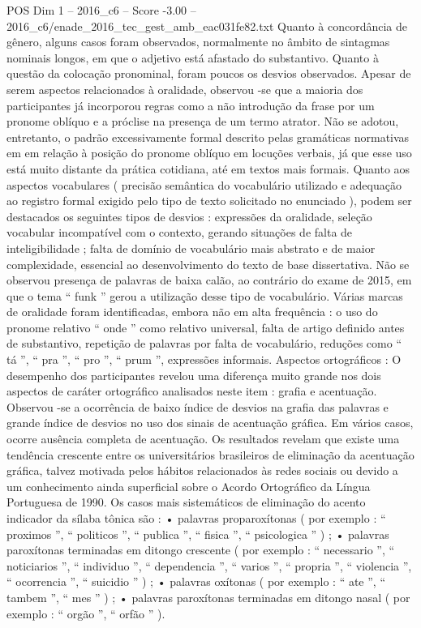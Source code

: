 \begin{textsample}{POS Dim 1 – 2016\_c6 – Score -3.00 – 2016\_c6/enade\_2016\_tec\_gest\_amb\_eac031fe82.txt}
Quanto à concordância de gênero, alguns casos foram observados, normalmente no âmbito de sintagmas nominais longos, em que o adjetivo está afastado do substantivo.
Quanto à questão da colocação pronominal, foram poucos os desvios observados.
Apesar de serem aspectos relacionados à oralidade, observou -se que a maioria dos participantes já incorporou regras como a não introdução da frase por um pronome oblíquo e a próclise na presença de um termo atrator.
Não se adotou, entretanto, o padrão excessivamente formal descrito pelas gramáticas normativas em em relação à posição do pronome oblíquo em locuções verbais, já que esse uso está muito distante da prática cotidiana, até em textos mais formais.
Quanto aos aspectos vocabulares ( precisão semântica do vocabulário utilizado e adequação ao registro formal exigido pelo tipo de texto solicitado no enunciado ), podem ser destacados os seguintes tipos de desvios : expressões da oralidade, seleção vocabular incompatível com o contexto, gerando situações de falta de inteligibilidade ; falta de domínio de vocabulário mais abstrato e de maior complexidade, essencial ao desenvolvimento do texto de base dissertativa.
Não se observou presença de palavras de baixa calão, ao contrário do exame de 2015, em que o tema “ funk ” gerou a utilização desse tipo de vocabulário.
Várias marcas de oralidade foram identificadas, embora não em alta frequência : o uso do pronome relativo “ onde ” como relativo universal, falta de artigo definido antes de substantivo, repetição de palavras por falta de vocabulário, reduções como “ tá ”, “ pra ”, “ pro ”, “ prum ”, expressões informais.
Aspectos ortográficos : O desempenho dos participantes revelou uma diferença muito grande nos dois aspectos de caráter ortográfico analisados neste item : grafia e acentuação.
Observou -se a ocorrência de baixo índice de desvios na grafia das palavras e grande índice de desvios no uso dos sinais de acentuação gráfica.
Em vários casos, ocorre ausência completa de acentuação.
Os resultados revelam que existe uma tendência crescente entre os universitários brasileiros de eliminação da acentuação gráfica, talvez motivada pelos hábitos relacionados às redes sociais ou devido a um conhecimento ainda superficial sobre o Acordo Ortográfico da Língua Portuguesa de 1990.
Os casos mais sistemáticos de eliminação do acento indicador da sílaba tônica são : • palavras proparoxítonas ( por exemplo : “ proximos ”, “ politicos ”, “ publica ”, “ fisica ”, “ psicologica ” ) ; • palavras paroxítonas terminadas em ditongo crescente ( por exemplo : “ necessario ”, “ noticiarios ”, “ individuo ”, “ dependencia ”, “ varios ”, “ propria ”, “ violencia ”, “ ocorrencia ”, “ suicidio ” ) ; • palavras oxítonas ( por exemplo : “ ate ”, “ tambem ”, “ mes ” ) ; • palavras paroxítonas terminadas em ditongo nasal ( por exemplo : “ orgão ”, “ orfão ” ).

\end{textsample}

